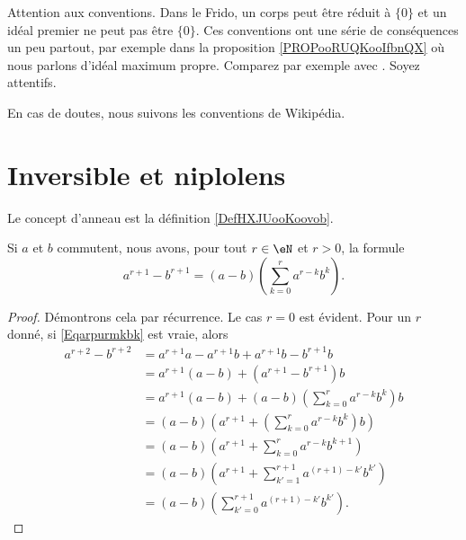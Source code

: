 
Attention aux conventions. Dans le Frido, un corps peut être réduit à \( \{ 0 \}\) et un idéal premier ne peut pas être \( \{ 0 \}\). Ces conventions ont une série de conséquences un peu partout, par exemple dans la proposition \ref{PROPooRUQKooIfbnQX} où nous parlons d'idéal maximum propre. Comparez par exemple avec \cite{ooWEUDooQybvIx}. Soyez attentifs.

En cas de doutes, nous suivons les conventions de Wikipédia.

\section{Inversible et niplolens}

Le concept d'anneau est la définition \ref{DefHXJUooKoovob}.

\begin{lemma}
    Si \( a\) et \( b\) commutent, nous avons, pour tout \( r \in \eN \) et \( r > 0\), la formule
    \begin{equation}        \label{Eqarpurmkbk}
        a^{r+1}-b^{r+1}=(a-b)\left(\sum_{k=0}^ra^{r-k}b^k\right).
    \end{equation}
\end{lemma}

\begin{proof}
  Démontrons cela par récurrence. Le cas \( r = 0 \) est évident. Pour
  un \( r \) donné, si \eqref{Eqarpurmkbk} est vraie, alors
  \begin{align*}
    a^{r+2}-b^{r+2}&= a^{r+1}a - a^{r+1}b +a^{r+1}b - b^{r+1}b\\
    &= a^{r+1}(a - b) + (a^{r+1} - b^{r+1})b\\
    &= a^{r+1}(a - b) + (a-b)\left(\sum_{k=0}^ra^{r-k}b^k\right)b\\
    &= (a - b) \left(a^{r+1} + \left(\sum_{k=0}^ra^{r-k}b^k\right)b\right)\\
    &= (a - b) \left(a^{r+1} + \sum_{k=0}^ra^{r-k}b^{k + 1}\right)\\
    &= (a - b) \left(a^{r+1} + \sum_{k'=1}^{r+1}a^{(r+1)-k'}b^{k'}\right)\\
    &= (a - b) \left(\sum_{k'=0}^{r+1}a^{(r+1)-k'}b^{k'}\right).
  \end{align*}
\end{proof}

